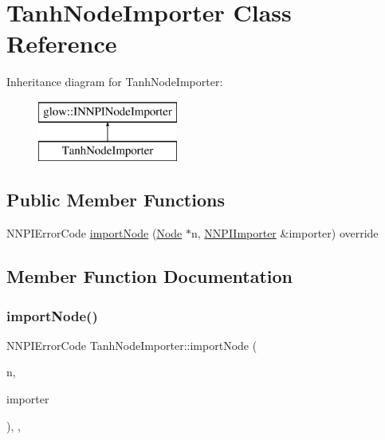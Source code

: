 \hypertarget{class_tanh_node_importer}{}\section{Tanh\+Node\+Importer Class Reference}
\label{class_tanh_node_importer}
Inheritance diagram for Tanh\+Node\+Importer\+:\begin{figure}[H]
\begin{center}
\leavevmode
\includegraphics[height=2.000000cm]{class_tanh_node_importer}
\end{center}
\end{figure}
\subsection*{Public Member Functions}
\begin{DoxyCompactItemize}
\item 
N\+N\+P\+I\+Error\+Code \hyperlink{class_tanh_node_importer_a27d445fa60ca2d3804b0de4c7bee94cd}{import\+Node} (\hyperlink{classglow_1_1_node}{Node} $\ast$n, \hyperlink{classglow_1_1_n_n_p_i_importer}{N\+N\+P\+I\+Importer} \&importer) override
\end{DoxyCompactItemize}


\subsection{Member Function Documentation}
\mbox{\label{class_tanh_node_importer_a27d445fa60ca2d3804b0de4c7bee94cd}} 
\subsubsection{\texorpdfstring{import\+Node()}{importNode()}}
{\footnotesize\ttfamily N\+N\+P\+I\+Error\+Code Tanh\+Node\+Importer\+::import\+Node (\begin{DoxyParamCaption}\item[{\hyperlink{classglow_1_1_node}{Node} $\ast$}]{n,  }\item[{\hyperlink{classglow_1_1_n_n_p_i_importer}{N\+N\+P\+I\+Importer} \&}]{importer }\end{DoxyParamCaption})\hspace{0.3cm}{\ttfamily [inline]}, {\ttfamily [override]}, {\ttfamily [virtual]}}

